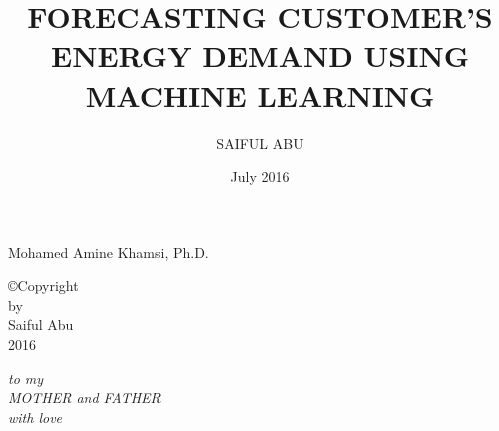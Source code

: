 \documentclass[12pt]{report}
\begin{document}

\setcounter{tocdepth}{2}


\title{FORECASTING CUSTOMER'S ENERGY DEMAND USING MACHINE LEARNING}

\author{SAIFUL ABU}
\date{July 2016}

                 {Mohamed Amine Khamsi, Ph.D.}


\makesigpage

\begin{CenteredPage}
\copyright Copyright\\[0.2in]
by\\[0.2in]
Saiful Abu\\[0.2in]
2016
\end{CenteredPage}

\begin{CenteredPage}
{\it to my\\[0.2in]
MOTHER and FATHER\\[0.2in]
with love}
\end{CenteredPage}


\end{document}
